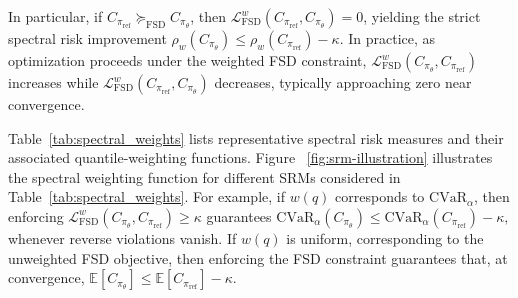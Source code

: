 In particular, if
\( C_{\pi_{\mathrm{ref}}}\succeq_{\mathrm{FSD}} C_{\pi_{\theta}} \),
then \( \mathcal{L}_{\mathrm{FSD}}^w(C_{\pi_{\mathrm{ref}}},C_{\pi_{\theta}})=0 \), yielding the strict spectral risk improvement
\(
  \rho_w\!\left(C_{\pi_{\theta}}\right)
  \le
  \rho_w\!\left(C_{\pi_{\mathrm{ref}}}\right)
  -
  \kappa.
\)
In practice, as optimization proceeds under the weighted FSD constraint,
\( \mathcal{L}_{\mathrm{FSD}}^w(C_{\pi_{\theta}},C_{\pi_{\mathrm{ref}}}) \) increases while
\( \mathcal{L}_{\mathrm{FSD}}^w(C_{\pi_{\textrm
{ref}}},C_{\pi_{\theta}}) \) decreases, typically approaching zero near convergence.

Table~\ref{tab:spectral_weights} lists representative spectral risk measures and their associated quantile-weighting functions. Figure ~\ref{fig:srm-illustration} illustrates the spectral weighting function for different SRMs considered in Table~\ref{tab:spectral_weights}. For example, if $w(q)$ corresponds to $\mathrm{CVaR}_{\alpha}$, then enforcing
\(
  \mathcal{L}_{\mathrm{FSD}}^w(C_{\pi_{\theta}},C_{\pi_{\mathrm{ref}}}) \ge \kappa
\)
guarantees
\(
  \mathrm{CVaR}_{\alpha}\!\left(C_{\pi_{\theta}}\right)
  \le
  \mathrm{CVaR}_{\alpha}\!\left(C_{\pi_{\mathrm{ref}}}\right)
  -
  \kappa,
\)
whenever reverse violations vanish.
If $w(q)$ is uniform, corresponding to the unweighted FSD objective, then enforcing the FSD constraint guarantees that, at convergence,
\(
  \mathbb{E}[C_{\pi_{\theta}}]
  \le
  \mathbb{E}[C_{\pi_{\mathrm{ref}}}]
  -
  \kappa.
\)

